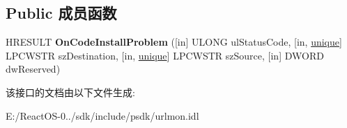 \subsection*{Public 成员函数}
\begin{DoxyCompactItemize}
\item 
\mbox{\label{interface_i_code_install_a0338ce0e794e39b4f16154aeb0297af8}} 
H\+R\+E\+S\+U\+LT {\bfseries On\+Code\+Install\+Problem} (\mbox{[}in\mbox{]} U\+L\+O\+NG ul\+Status\+Code, \mbox{[}in, \hyperlink{interfaceunique}{unique}\mbox{]} L\+P\+C\+W\+S\+TR sz\+Destination, \mbox{[}in, \hyperlink{interfaceunique}{unique}\mbox{]} L\+P\+C\+W\+S\+TR sz\+Source, \mbox{[}in\mbox{]} D\+W\+O\+RD dw\+Reserved)
\end{DoxyCompactItemize}


该接口的文档由以下文件生成\+:\begin{DoxyCompactItemize}
\item 
E\+:/\+React\+O\+S-\/0../sdk/include/psdk/urlmon.\+idl\end{DoxyCompactItemize}
